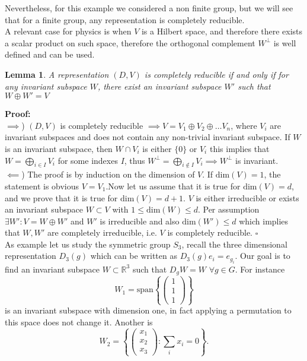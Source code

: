 \documentclass[12pt]{book}
\theoremstyle{plain}
\newcommand{\R}{\mathbb{R}}
\newcommand{\x}{\mathbf{x}}
\newtheorem{lem}[thm]{Lemma}
\theoremstyle{definition}
\theoremstyle{remark}
\begin{document}
Nevertheless, for this example we considered a non finite group, but we will see that for a finite group, any representation is completely reducible. \\
A relevant case for physics is when $V$ is a Hilbert space, and therefore there exists a scalar product on such space, therefore the orthogonal complement $W^\perp$ is well defined and can be used.
\begin{lem}\label{lemmautile}
A representation $(D,V)$ is completely reducible if and only if for any invariant subspace $W$, there exist an invariant subspace $W'$ such that $W\oplus W' = V$
\end{lem}
\hspace{-1.4em}\textbf{Proof:}\\
$\implies$) $(D,V)$ is completely reducible $\implies V= V_1\oplus V_2\oplus \dots V_n$, where $V_i$ are invariant subspaces and does not contain any non-trivial invariant subspace. If $W$ is an invariant subspace, then $W\cap V_i$ is either $\{0\}$ or $V_i$ this implies that $W = \bigoplus_{i\in I} V_i$ for some indexes $I$, thus $W^\perp = \bigoplus_{i\notin I} V_i \implies W^\perp$ is invariant.\\
$\impliedby$) The proof is by induction on the dimension of $V$. If $\text{dim}(V) = 1$, the statement is obvious $V= V_1$.Now let us assume that it is true for $\text{dim}(V) = d$, and we prove that it is true for $\text{dim}(V) = d+1$. $V$ is either irreducible or exists an invariant subspace $W\subset V$ with $1\leq \text{dim}(W)\leq d$. Per assumption $\exists W' : V = W\oplus W'$ and $W'$ is irreducible and also $\text{dim}(W') \leq d$ which implies that $W,W'$ are completely irreducible, i.e. $V$ is completely reducible. \hfill\ensuremath{\square}\\
As example let us study the symmetric group $S_3$, recall the three dimensional representation $D_3(g)$ which can be written as $D_3(g)e_i = e_{g_i}$. Our goal is to find an invariant subspace $W\subset \R^3$ such that $D_g W = W$ $\forall g\in G$. For instance
\[W_1 = \text{span}\left\{\begin{pmatrix}1\\1\\1\end{pmatrix}\right\}\]
is an invariant subspace with dimension one, in fact applying a permutation to this space does not change it. Another is 
\[W_2 = \left\{\begin{pmatrix}x_1\\x_2\\x_3\end{pmatrix}:\sum_i x_i = 0\right\}.\]
\end{document}
